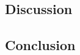 \documentclass[a4paper,ngerman]{atseminar}
\begin{document}
\subsection{Discussion}


\subsection{Conclusion}













\end{document}
